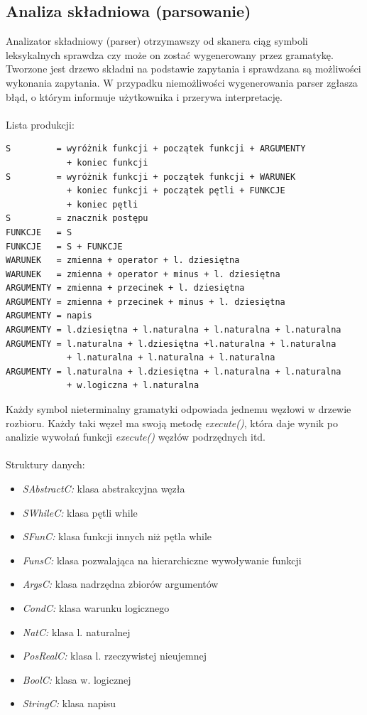 \documentclass[11pt,a4paper]{article}
\begin{document}
\subsection{Analiza składniowa (parsowanie)}
Analizator składniowy (parser) otrzymawszy od skanera ciąg symboli leksykalnych sprawdza czy może on zostać wygenerowany przez gramatykę. Tworzone jest drzewo składni na podstawie zapytania i sprawdzana są możliwości wykonania zapytania. W przypadku niemożliwości wygenerowania parser zgłasza błąd, o którym informuje użytkownika i przerywa interpretację.
\\\\
Lista produkcji:
\begin{verbatim}
S         = wyróżnik funkcji + początek funkcji + ARGUMENTY
            + koniec funkcji
S         = wyróżnik funkcji + początek funkcji + WARUNEK
            + koniec funkcji + początek pętli + FUNKCJE
            + koniec pętli
S         = znacznik postępu
FUNKCJE   = S
FUNKCJE   = S + FUNKCJE
WARUNEK   = zmienna + operator + l. dziesiętna
WARUNEK   = zmienna + operator + minus + l. dziesiętna
ARGUMENTY = zmienna + przecinek + l. dziesiętna
ARGUMENTY = zmienna + przecinek + minus + l. dziesiętna
ARGUMENTY = napis
ARGUMENTY = l.dziesiętna + l.naturalna + l.naturalna + l.naturalna
ARGUMENTY = l.naturalna + l.dziesiętna +l.naturalna + l.naturalna
            + l.naturalna + l.naturalna + l.naturalna
ARGUMENTY = l.naturalna + l.dziesiętna + l.naturalna + l.naturalna
            + w.logiczna + l.naturalna
\end{verbatim}

Każdy symbol nieterminalny gramatyki odpowiada jednemu węzłowi w drzewie rozbioru. Każdy taki węzeł ma swoją metodę \emph{execute()}, która daje wynik po analizie wywołań funkcji \emph{execute()} węzłów podrzędnych itd.\\\\
Struktury danych:
\begin{itemize}
\item \emph{SAbstractC:} 	klasa abstrakcyjna węzła
\item \emph{SWhileC:}		klasa pętli while
\item \emph{SFunC:}		klasa funkcji innych niż pętla while
\item \emph{FunsC:}		klasa pozwalająca na hierarchiczne wywoływanie funkcji
\item \emph{ArgsC:}		klasa nadrzędna zbiorów argumentów
\item \emph{CondC:}		klasa warunku logicznego
\item \emph{NatC:}			klasa l. naturalnej
\item \emph{PosRealC:}		klasa l. rzeczywistej nieujemnej
\item \emph{BoolC:}		klasa w. logicznej
\item \emph{StringC:}		klasa napisu
\end{itemize}
\end{document}
